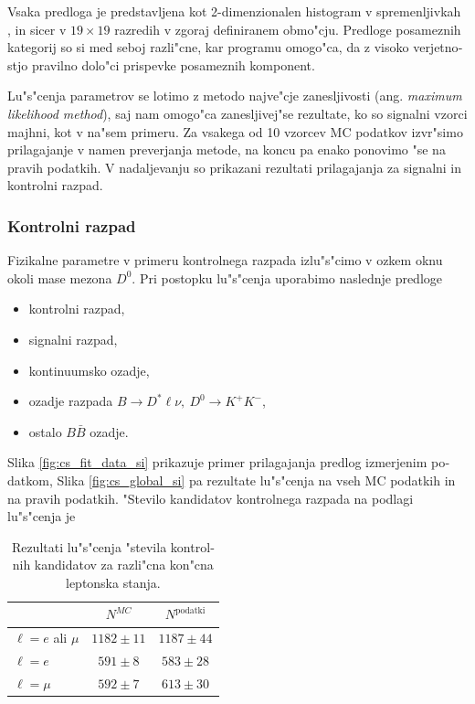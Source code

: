\begin{otherlanguage}{slovene}
Vsaka predloga je predstavljena kot 2-dimenzionalen histogram v spremenljivkah \varss, in sicer v $19\times 19$ razredih v zgoraj definiranem obmo"cju. Predloge posameznih kategorij so si med seboj razli"cne, kar programu omogo"ca, da z visoko verjetnostjo pravilno dolo"ci prispevke posameznih komponent.

Lu"s"cenja parametrov se lotimo z metodo najve"cje zanesljivosti (ang. \textit{maximum likelihood method}), saj nam omogo"ca zanesljivej"se rezultate, ko so signalni vzorci majhni, kot v na"sem primeru. Za vsakega od 10 vzorcev MC podatkov izvr"simo prilagajanje v namen preverjanja metode, na koncu pa enako ponovimo "se na pravih podatkih. V nadaljevanju so prikazani rezultati prilagajanja za signalni in kontrolni razpad.

\subsubsection{Kontrolni razpad}
Fizikalne parametre v primeru kontrolnega razpada izlu"s"cimo v ozkem oknu okoli mase mezona $D^0$. Pri postopku lu"s"cenja uporabimo naslednje predloge
\begin{itemize}
\item kontrolni razpad,
\item signalni razpad,
\item kontinuumsko ozadje,
\item ozadje razpada $B\to D^* \ell \nu,~D^0 \to K^+K^-$,
\item ostalo $B \bar B$ ozadje.
\end{itemize}

Slika \ref{fig:cs_fit_data_si} prikazuje primer prilagajanja predlog izmerjenim podatkom, Slika \ref{fig:cs_global_si} pa rezultate lu"s"cenja na vseh MC podatkih in na pravih podatkih. "Stevilo kandidatov kontrolnega razpada na podlagi lu"s"cenja je

\begin{table}[H]
	\centering
	\begin{tabular}{l|c|c}
		& $N^{MC}$ & $N^{\mathrm{podatki}}$ \\
		\toprule
		$\ell = e$ ali $\mu$ & $1182 \pm 11$ & $1187 \pm 44$\\
		$\ell = e$ & $591 \pm 8$ & $583 \pm 28$ \\
		$\ell = \mu$ & $592 \pm 7$ & $613 \pm 30$\\
		\bottomrule
	\end{tabular}
	\captionsetup{width=0.8\linewidth}
	\caption{Rezultati lu"s"cenja "stevila kontrolnih kandidatov za razli"cna kon"cna leptonska stanja.}
	\label{tab:cs_fit_yield_si}
\end{table}


\end{otherlanguage}
